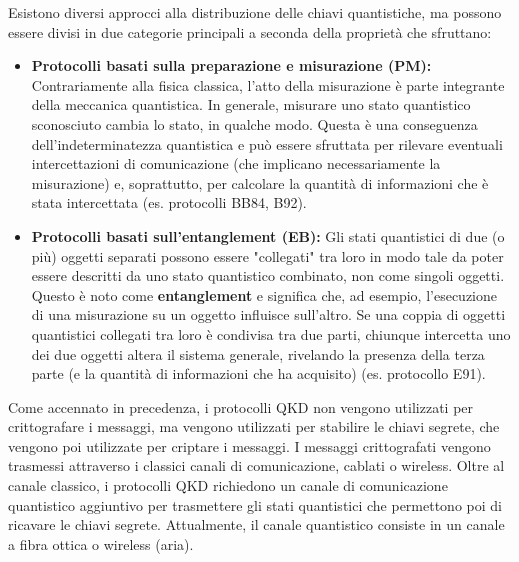 \noindent Esistono diversi approcci alla distribuzione delle chiavi quantistiche, ma possono essere divisi in due categorie principali a seconda della proprietà che sfruttano:
\begin{itemize}
    \item \textbf{Protocolli basati sulla preparazione e misurazione (PM):} Contrariamente alla fisica classica, l'atto della misurazione è parte integrante della meccanica quantistica. In generale, misurare uno stato quantistico sconosciuto cambia lo stato, in qualche modo. Questa è una conseguenza dell'indeterminatezza quantistica e può essere sfruttata per rilevare eventuali intercettazioni di comunicazione (che implicano necessariamente la misurazione) e, soprattutto, per calcolare la quantità di informazioni che è stata intercettata (es. protocolli BB84, B92).
    \item \textbf{Protocolli basati sull'entanglement (EB):} Gli stati quantistici di due (o più) oggetti separati possono essere "collegati" tra loro in modo tale da poter essere descritti da uno stato quantistico combinato, non come singoli oggetti. Questo è noto come \textbf{entanglement} e significa che, ad esempio, l'esecuzione di una misurazione su un oggetto influisce sull'altro. Se una coppia di oggetti quantistici collegati tra loro è condivisa tra due parti, chiunque intercetta uno dei due oggetti altera il sistema generale, rivelando la presenza della terza parte (e la quantità di informazioni che ha acquisito) (es. protocollo E91).
\end{itemize}

\noindent Come accennato in precedenza, i protocolli QKD non vengono utilizzati per crittografare i messaggi, ma vengono utilizzati per stabilire le chiavi segrete, che vengono poi utilizzate per criptare i messaggi. I messaggi crittografati vengono trasmessi attraverso i classici canali di comunicazione, cablati o wireless. Oltre al canale classico, i protocolli QKD richiedono un canale di comunicazione quantistico aggiuntivo per trasmettere gli stati quantistici che permettono poi di ricavare le chiavi segrete. Attualmente, il canale quantistico consiste in un canale a fibra ottica o wireless (aria).

